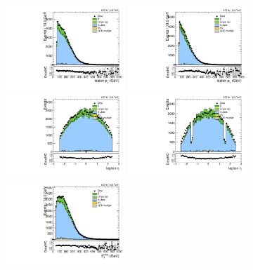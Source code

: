 \begin{figure}[htbp]
  \centering
  \includegraphics[width=0.4\textwidth]{fig/controlPlots/SB_b1_mu_allP_allC_allD_Run2_lnujj_l1_l_pt.pdf}
  \includegraphics[width=0.4\textwidth]{fig/controlPlots/SB_b1_e_allP_allC_allD_Run2_lnujj_l1_l_pt.pdf}\\
  \includegraphics[width=0.4\textwidth]{fig/controlPlots/SB_b1_mu_allP_allC_allD_Run2_lnujj_l1_l_eta.pdf}
  \includegraphics[width=0.4\textwidth]{fig/controlPlots/SB_b1_e_allP_allC_allD_Run2_lnujj_l1_l_eta.pdf}\\
  \includegraphics[width=0.4\textwidth]{fig/controlPlots/SB_b1_mu_allP_allC_allD_Run2_met_pt.pdf}

\end{figure}
